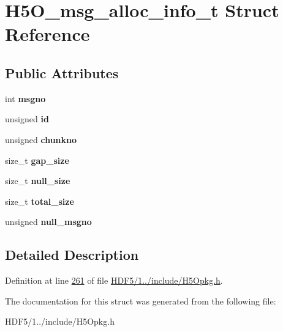 \hypertarget{struct_h5_o__msg__alloc__info__t}{}\section{H5\+O\+\_\+msg\+\_\+alloc\+\_\+info\+\_\+t Struct Reference}
\label{struct_h5_o__msg__alloc__info__t}
\subsection*{Public Attributes}
\begin{DoxyCompactItemize}
\item 
\mbox{\label{struct_h5_o__msg__alloc__info__t_a9dc0a596a7721a7752cd44502186d18f}} 
int {\bfseries msgno}
\item 
\mbox{\label{struct_h5_o__msg__alloc__info__t_ace8dbf15edc8e20dc32cfe24a7d88eb1}} 
unsigned {\bfseries id}
\item 
\mbox{\label{struct_h5_o__msg__alloc__info__t_a6ae24a608f0ded3e7f8b04dd2612b0b3}} 
unsigned {\bfseries chunkno}
\item 
\mbox{\label{struct_h5_o__msg__alloc__info__t_a69681f77030d8e833a03f2bb9c0fa569}} 
size\+\_\+t {\bfseries gap\+\_\+size}
\item 
\mbox{\label{struct_h5_o__msg__alloc__info__t_aa0ebdf888a948ad17b3fd116d0816d21}} 
size\+\_\+t {\bfseries null\+\_\+size}
\item 
\mbox{\label{struct_h5_o__msg__alloc__info__t_ac83e9ae07f9e46e97993fda957808dd4}} 
size\+\_\+t {\bfseries total\+\_\+size}
\item 
\mbox{\label{struct_h5_o__msg__alloc__info__t_ad09c31d200311f01e13a3f060e3e57a3}} 
unsigned {\bfseries null\+\_\+msgno}
\end{DoxyCompactItemize}


\subsection{Detailed Description}


Definition at line \hyperlink{_h_d_f5_21_810_81_2include_2_h5_opkg_8h_source_l00261}{261} of file \hyperlink{_h_d_f5_21_810_81_2include_2_h5_opkg_8h_source}{H\+D\+F5/1../include/\+H5\+Opkg.\+h}.



The documentation for this struct was generated from the following file\+:\begin{DoxyCompactItemize}
\item 
H\+D\+F5/1../include/\+H5\+Opkg.\+h\end{DoxyCompactItemize}
